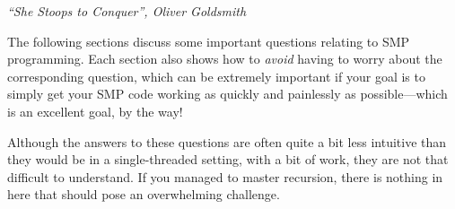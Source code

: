 
%
	 {\emph{``She Stoops to Conquer'', Oliver Goldsmith}}

The following sections discuss some important questions relating to
SMP programming.
Each section also shows how to {\em avoid} having to worry about
the corresponding question, which can be extremely important if
your goal is to simply get your SMP code working as quickly and
painlessly as possible---which is an excellent goal, by the way!

Although the answers to these questions are often quite a bit less
intuitive than they would be in a single-threaded setting,
with a bit of work, they are not that difficult to understand.
If you managed to master recursion, there is nothing in here that should
pose an overwhelming challenge.








